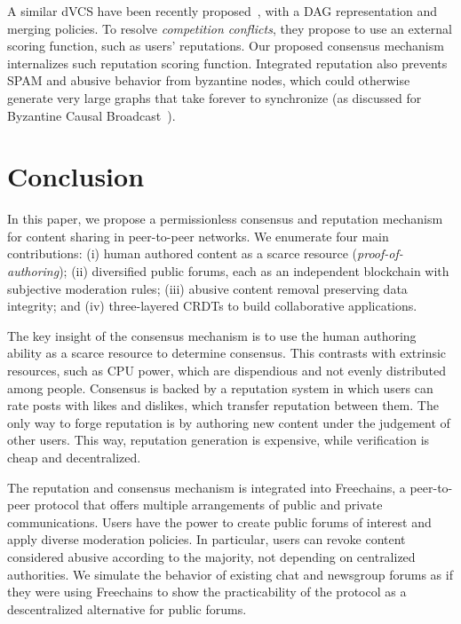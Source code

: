 \documentclass[12pt]{article}
\newcommand{\FC}       {Freechains\xspace}
\begin{document}
A similar dVCS have been recently proposed~\cite{p2p.dvcs}, with a DAG
representation and merging policies.
To resolve \emph{competition conflicts}, they propose to use an external
scoring function, such as users' reputations.
Our proposed consensus mechanism internalizes such reputation scoring function.
Integrated reputation also prevents SPAM and abusive behavior from byzantine
nodes, which could otherwise generate very large graphs that take forever to
synchronize (as discussed for Byzantine Causal Broadcast~\cite{p2p.dag.sync}).

\section{Conclusion}
\label{sec.conclusion}

In this paper, we propose a permissionless consensus and reputation mechanism
for content sharing in peer-to-peer networks.
We enumerate four main contributions:
    (i)   human authored content as a scarce resource
          (\emph{proof-of-authoring});
    (ii)  diversified public forums, each as an independent blockchain with
          subjective moderation rules;
    (iii) abusive content removal preserving data integrity; and
    (iv)  three-layered CRDTs to build collaborative applications.

The key insight of the consensus mechanism is to use the human authoring
ability as a scarce resource to determine consensus.
This contrasts with extrinsic resources, such as CPU power, which are
dispendious and not evenly distributed among people.
%
Consensus is backed by a reputation system in which users can rate posts with
likes and dislikes, which transfer reputation between them.
The only way to forge reputation is by authoring new content under the
judgement of other users.
This way, reputation generation is expensive, while verification is cheap and
decentralized.

The reputation and consensus mechanism is integrated into \FC, a peer-to-peer
protocol that offers multiple arrangements of public and private
communications.
Users have the power to create public forums of interest and apply diverse
moderation policies.
In particular, users can revoke content considered abusive according to the
majority, not depending on centralized authorities.
%
We simulate the behavior of existing chat and newsgroup forums as if they were
using \FC to show the practicability of the protocol as a descentralized
alternative for public forums.

\end{document}
